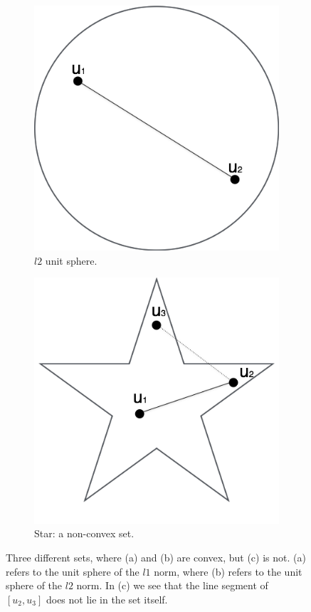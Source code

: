 \documentclass[abstracton]{scrreprt}
\begin{document}
\begin{figure}[!ht]
\begin{subfigure}[b]{0.3\textwidth}
                \includegraphics[width=\textwidth]{img/unit_l2_norm.png}
                \caption{$l2$ unit sphere.}
            \end{subfigure}
            \begin{subfigure}[b]{0.3\textwidth}
                \includegraphics[width=\textwidth]{img/non_convex_set.png}
                \caption{Star: a non-convex set.}
            \end{subfigure}
            \caption[Examples of convex sets.]{Three different sets, where (a) and (b) are convex, but (c) is not. (a) refers to the unit sphere of the $l1$ norm, where (b) refers to the unit sphere of the $l2$ norm. In (c) we see that the line segment of $[u_{2}, u_{3}]$ does not lie in the set itself.}
            \label{fig:convex_and_non_convex_sets}
        \end{figure}
\end{document}
